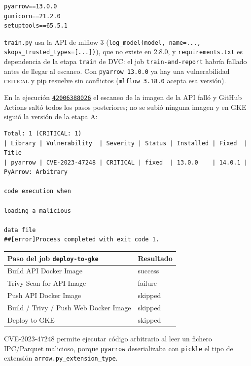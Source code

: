 \documentclass[11pt,a4paper]{article}
\newcommand{\code}[1]{\texttt{#1}}
\newcommand{\run}[1]{\href{https://github.com/JES0406/mlops-practica-icai/actions/runs/#1}{\code{#1}}}
\begin{document}
\begin{lstlisting}[style=plain]
pyarrow==13.0.0
gunicorn==21.2.0
setuptools==65.5.1
\end{lstlisting}

\begin{nota}[Por qué no se fijó \code{mlflow==2.8.0}]
\code{train.py} usa la API de mlflow 3 (\code{log\_model(model, name=...,
skops\_trusted\_types=[...])}), que no existe en 2.8.0, y \code{requirements.txt} es
dependencia de la etapa \code{train} de DVC: el job \code{train-and-report} habría fallado
antes de llegar al escaneo. Con \code{pyarrow 13.0.0} ya hay una vulnerabilidad
\textsc{critical} y pip resuelve sin conflictos (\code{mlflow 3.18.0} acepta esa versión).
\end{nota}

En la ejecución \run{42006388026} el escaneo de la imagen de la API falló y GitHub Actions
saltó todos los pasos posteriores; no se subió ninguna imagen y en GKE siguió la versión
de la etapa A:

\begin{lstlisting}[style=plain]
Total: 1 (CRITICAL: 1)
| Library | Vulnerability  | Severity | Status | Installed | Fixed  | Title
| pyarrow | CVE-2023-47248 | CRITICAL | fixed  | 13.0.0    | 14.0.1 | PyArrow: Arbitrary
                                                                    code execution when
                                                                    loading a malicious
                                                                    data file
##[error]Process completed with exit code 1.
\end{lstlisting}

\begin{center}
\begin{tabular}{ll}
\toprule
Paso del job \code{deploy-to-gke} & Resultado \\
\midrule
Build API Docker Image & \textcolor{okgreen}{success} \\
Trivy Scan for API Image & \textcolor{badred}{failure} \\
Push API Docker Image & skipped \\
Build / Trivy / Push Web Docker Image & skipped \\
Deploy to GKE & skipped \\
\bottomrule
\end{tabular}
\end{center}

CVE-2023-47248 permite ejecutar código arbitrario al leer un fichero IPC/Parquet
malicioso, porque \code{pyarrow} deserializaba con \code{pickle} el tipo de extensión
\code{arrow.py\_extension\_type}.
\end{document}
